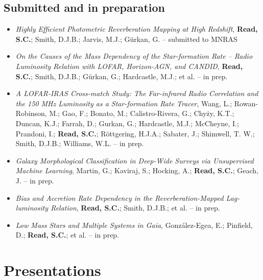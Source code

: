 \documentclass[letterpaper]{twentysecondcv} %
\begin{document}
\subsection{Submitted and in preparation}
\begin{itemize}
     \item \textit{Highly Efficient Photometric Reverberation Mapping at High Redshift}, \textbf{Read, S.C.}; Smith, D.J.B.; Jarvis, M.J.; Gürkan, G. -- submitted to MNRAS\\
 \item \textit{On the Causes of the Mass Dependency of the Star-formation Rate -- Radio
Luminosity Relation with LOFAR, Horizon-AGN, and CANDID}, \textbf{Read, S.C.}; Smith, D.J.B.; Gürkan, G.; Hardcastle, M.J.; et al. -- in prep.\\
 \item \textit{A LOFAR-IRAS Cross-match Study: The Far-infrared Radio Correlation and
the 150 MHz Luminosity as a Star-formation Rate Tracer}, Wang, L.; Rowan-Robinson, M.; Gao, F.; Bonato, M.; Calistro-Rivera, G.;
Chyży, K.T.; Duncan, K.J.; Farrah, D.; Gurkan, G.; Hardcastle, M.J.;
McCheyne, I.; Prandoni, I.; \textbf{Read, S.C.}; Röttgering, H.J.A.;
Sabater, J.; Shimwell, T. W.; Smith, D.J.B.; Williams, W.L. -- in prep.\\
 \item \textit{Galaxy Morphological Classification in Deep-Wide Surveys via
Unsupervised Machine Learning}, Martin, G.; Kaviraj, S.; Hocking, A.; \textbf{Read, S.C.}; Geach, J. -- in prep.\\
 \item \textit{Bias and Accretion Rate Dependency in the Reverberation-Mapped
Lag-luminosity Relation}, \textbf{Read, S.C.}; Smith, D.J.B.; et al. -- in prep.\\
 \item \textit{Low Mass Stars and Multiple Systems in Gaia}, González-Egea, E.; Pinfield, D.; \textbf{Read, S.C.}; et al. -- in prep.\\
\end{itemize}

\section{Presentations}
\begin{twenty}
     \\
 \\
 \\
 \\
\end{twenty}
\end{document}
